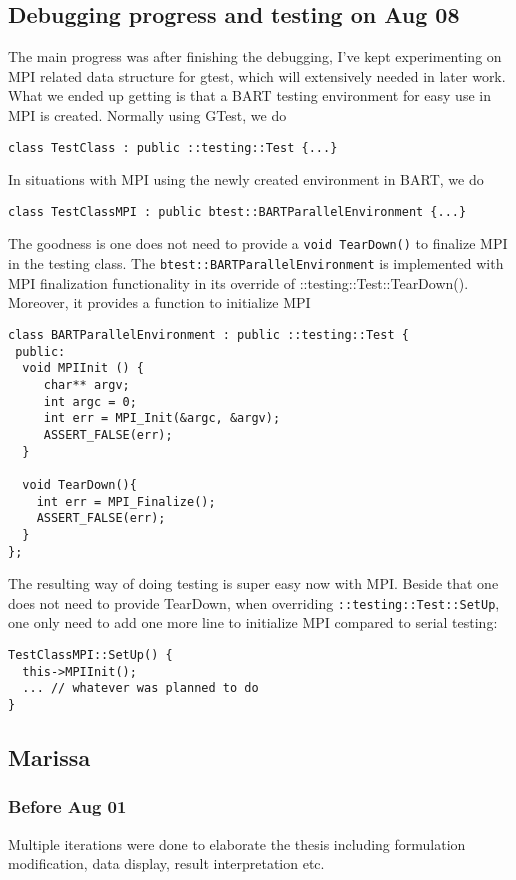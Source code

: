 \documentclass{article}
\begin{document}
\subsection{Debugging progress and testing on Aug 08}
The main progress was after finishing the debugging, I've kept experimenting on MPI related data structure for gtest, which will extensively needed in later work. What we ended up getting is that a BART testing environment for easy use in MPI is created. Normally using GTest, we do
\begin{verbatim}
class TestClass : public ::testing::Test {...}
\end{verbatim}
In situations with MPI using the newly created environment in BART, we do
\begin{verbatim}
class TestClassMPI : public btest::BARTParallelEnvironment {...}
\end{verbatim}
The goodness is one does not need to provide a {\tt void TearDown()} to finalize MPI in the testing class. The {\tt btest::BARTParallelEnvironment} is implemented with MPI finalization functionality in its override of {::testing::Test::TearDown()}. Moreover, it provides a function to initialize MPI
\begin{verbatim}
class BARTParallelEnvironment : public ::testing::Test {
 public:
  void MPIInit () {
     char** argv;
     int argc = 0;
     int err = MPI_Init(&argc, &argv);
     ASSERT_FALSE(err);
  }
  
  void TearDown(){
    int err = MPI_Finalize();
    ASSERT_FALSE(err);
  }
};
\end{verbatim}

The resulting way of doing testing is super easy now with MPI. Beside that one does not need to provide TearDown, when overriding {\tt ::testing::Test::SetUp}, one only need to add one more line to initialize MPI compared to serial testing:
\begin{verbatim}
TestClassMPI::SetUp() {
  this->MPIInit();
  ... // whatever was planned to do
}
\end{verbatim}
\subsection{Marissa}
\subsubsection{Before Aug 01}
Multiple iterations were done to elaborate the thesis including formulation modification, data display, result interpretation etc.
\end{document}
